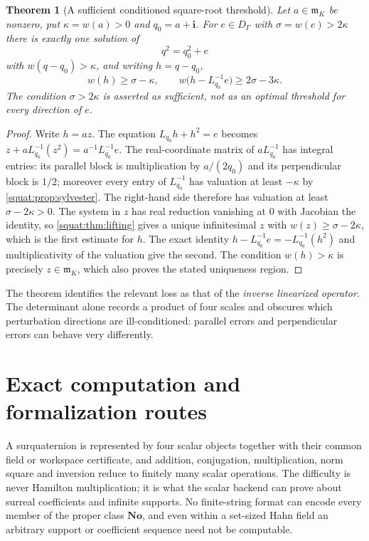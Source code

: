\documentclass[11pt,letterpaper]{article}
\numberwithin{equation}{section}
\newtheorem{theorem}{Theorem}[section]
\theoremstyle{definition}
\theoremstyle{remark}
\newcommand{\No}{\mathbf{No}}
\newcommand{\mm}{\mathfrak m}
\newcommand{\ii}{\mathbf i}
\begin{document}
\begin{theorem}[A sufficient conditioned square-root threshold]\label{squat:thm:conditioned}
Let $a\in\mm_K$ be nonzero, put $\kappa=w(a)>0$ and $q_0=a+\ii$. For $e\in D_\Gamma$ with
$\sigma=w(e)>2\kappa$ there is exactly one solution of
\[
 q^2=q_0^2+e
\]
with $w(q-q_0)>\kappa$, and writing $h=q-q_0$,
\begin{equation}\label{squat:eq:conditioned-bounds}
 w(h)\ge\sigma-\kappa,\qquad
 w\bigl(h-L_{q_0}^{-1}e\bigr)\ge2\sigma-3\kappa .
\end{equation}
The condition $\sigma>2\kappa$ is asserted as \emph{sufficient}, not as an optimal
threshold for every direction of $e$.
\end{theorem}
\begin{proof}
Write $h=az$. The equation $L_{q_0}h+h^2=e$ becomes
$z+aL_{q_0}^{-1}(z^2)=a^{-1}L_{q_0}^{-1}e$. The real-coordinate matrix of
$aL_{q_0}^{-1}$ has integral entries: its parallel block is multiplication by
$a/(2q_0)$ and its perpendicular block is $1/2$; moreover every entry of $L_{q_0}^{-1}$
has valuation at least $-\kappa$ by \cref{squat:prop:sylvester}. The right-hand side
therefore has valuation at least $\sigma-2\kappa>0$. The system in $z$ has real reduction
vanishing at $0$ with Jacobian the identity, so \cref{squat:thm:lifting} gives a unique
infinitesimal $z$ with $w(z)\ge\sigma-2\kappa$, which is the first estimate for $h$. The
exact identity $h-L_{q_0}^{-1}e=-L_{q_0}^{-1}(h^2)$ and multiplicativity of the valuation
give the second. The condition $w(h)>\kappa$ is precisely $z\in\mm_K$, which also proves
the stated uniqueness region.
\end{proof}

The theorem identifies the relevant loss as that of the \emph{inverse linearized
operator}. The determinant alone records a product of four scales and obscures which
perturbation directions are ill-conditioned: parallel errors and perpendicular errors can
behave very differently.

\section{Exact computation and formalization routes}\label{squat:sec:computation}

A surquaternion is represented by four scalar objects together with their common field or
workspace certificate, and addition, conjugation, multiplication, norm square and
inversion reduce to finitely many scalar operations. The difficulty is never Hamilton
multiplication; it is what the scalar backend can prove about surreal coefficients and
infinite supports. No finite-string format can encode every member of the proper class
$\No$, and even within a set-sized Hahn field an arbitrary support or coefficient sequence
need not be computable.
\end{document}

